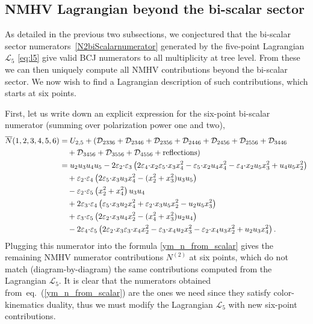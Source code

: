 \documentclass[11pt,a4paper]{article}
\newcommand{\ee}[2]{\varepsilon_{#1} {\cdot} \varepsilon_{#2}}
\newcommand{\z}{x}
\newcommand{\ez}[2]{\varepsilon_{#1} {\cdot} \z_{#2}}
\def\eqn#1{eq.~(\ref{#1})}
\begin{document}
\subsection{NMHV Lagrangian beyond the bi-scalar sector}
As detailed in the previous two subsections, we conjectured that the bi-scalar sector numerators~\eqref{N2biScalarnumerator} generated by the five-point Lagrangian $\mathcal{L}_5$ \eqref{eq:l5} give valid BCJ numerators to all multiplicity at tree level. From these we can then uniquely compute all NMHV contributions beyond the bi-scalar sector.  We now wish to find a Lagrangian description of such contributions, which starts at six points.   

First, let us write down an explicit expression for the six-point bi-scalar numerator (summing over polarization power one and two),
\begin{align}
\overline{N}(1,2,3,4,5,6)&= U_{2,5} +   ( \mathcal{D}_{2336} + \mathcal{D}_{2346}+  \mathcal{D}_{2356}+  \mathcal{D}_{2446}+
 \mathcal{D}_{2456}+  \mathcal{D}_{2556}+ \mathcal{D}_{3446} \notag \\
 & \quad +  \mathcal{D}_{3456}+  \mathcal{D}_{3556}+  \mathcal{D}_{4556}  + \text{reflections}) \notag \\
\quad &= u_2 u_3 u_4 u_5 -2 \ee{2}{3} \left( 2 \ez{4}{2} \ez{5}{3} \z_4^2 - \ez{5}{2}   u_4 \z_4^2 - \ez{4}{2}  u_5 \z_3^2 +  u_4 u_5 \z_2^2 \right) \notag \\
%
& \quad + \ee{2}{4} \left( 2 \ez{5}{3}  u_3 \z_4^2 - (\z_2^2 + \z_3^2) u_3 u_5 \right)  \notag \\
%
& \quad - \ee{2}{5} \left( \z_2^2+ \z_4^2 \right) u_3 u_4 \notag \\
%
& \quad +2 \ee{3}{4} \left( \ez{5}{3} u_2 \z_4^2 + \ez{2}{3}  u_5 \z_2^2 -  u_2 u_5 \z_3^2 \right) \notag \\
%
& \quad + \ee{3}{5} \left( 2 \ez{2}{3}  u_4 \z_2^2 -(\z_4^2+\z_3^2) u_2 u_4 \right) \notag \\
%
& \quad -2 \ee{4}{5} \left(2 \ez{2}{3} \ez{3}{4} \z_2^2 - \ez{3}{4}  u_2 \z_3^2 - \ez{2}{4}  u_3 \z_2^2 +  u_2 u_3 \z_4^2\right).
\end{align}
Plugging this numerator into the formula \eqref{ym_n_from_scalar} gives the remaining NMHV numerator contributions $N^{(2)}$ at six points, which do not match (diagram-by-diagram) the same contributions computed from the Lagrangian $\mathcal{L}_5$. %
It is clear that the numerators obtained from~\eqn{ym_n_from_scalar} are the ones we need since they satisfy color-kinematics duality, thus we must modify the Lagrangian $\mathcal{L}_5$ with new six-point contributions.  
 
\end{document}
